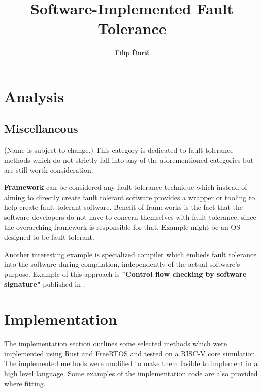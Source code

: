 \documentclass[12pt, letterpaper]{article}
\title{
    \Huge \textbf{Software-Implemented Fault Tolerance}
}
\author{Filip Ďuriš}
\begin{document}

\newpage

\tableofcontents
\newpage


\newpage




\clearpage
\section{Analysis}





\subsection{Miscellaneous}
(Name is subject to change.)
This category is dedicated to fault tolerance methods which do not strictly fall into any of the aforementioned categories but are still worth consideration.

\textbf{Framework} can be considered any fault tolerance technique which instead of aiming to directly create fault tolerant software provides a wrapper or tooling to help create fault tolerant software. Benefit of frameworks is the fact that the software developers do not have to concern themselves with fault tolerance, since the overarching framework is responsible for that. Example might be an OS designed to be fault tolerant.

Another interesting example is specialized compiler which embeds fault tolerance into the software during compilation, independently of the actual software's purpose. Example of this approach is \textbf{"Control flow checking by software signature"} published in \cite{994926}.

\clearpage

\newpage

\clearpage
\section{Implementation}

The implementation section outlines some selected methods which were implemented using Rust and FreeRTOS and tested on a RISC-V core simulation. The implemented methods were modified to make them fasible to implement in a high level language. Some examples of the implementation code are also provided where fitting.


\clearpage
\end{document}
